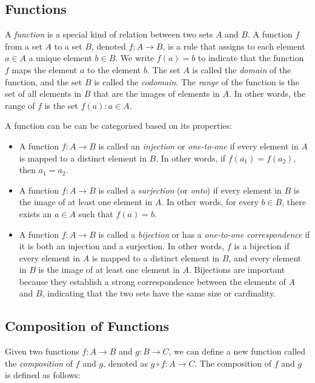\documentclass{report}
\begin{document}
\subsection{Functions}

A \textit{function} is a special kind of relation between two sets $A$ and $B$. A function $f$ from a set $A$ to a set $B$, denoted $f : A \to B$, is a rule that assigns to each element $a \in A$ a unique element $b \in B$. We write $f(a) = b$ to indicate that the function $f$ maps the element $a$ to the element $b$. The set $A$ is called the \textit{domain} of the function, and the set $B$ is called the \textit{codomain}. The \textit{range} of the function is the set of all elements in $B$ that are the images of elements in $A$. In other words, the range of $f$ is the set ${f(a) : a \in A}$.

A function can be can be categorised based on its properties:

\begin{itemize}
    \item A function $f : A \to B$ is called an \textit{injection} or \textit{one-to-one} if every element in $A$ is mapped to a distinct element in $B$. In other words, if $f(a_1) = f(a_2)$, then $a_1 = a_2$.

    \item A function $f : A \to B$ is called a \textit{surjection} (or \textit{onto}) if every element in $B$ is the image of at least one element in $A$. In other words, for every $b \in B$, there exists an $a \in A$ such that $f(a) = b$.

    \item A function $f : A \to B$ is called a \textit{bijection} or has a \textit{one-to-one correspondence} if it is both an injection and a surjection. In other words, $f$ is a bijection if every element in $A$ is mapped to a distinct element in $B$, and every element in $B$ is the image of at least one element in $A$. Bijections are important because they establish a strong correspondence between the elements of $A$ and $B$, indicating that the two sets have the same size or cardinality.

\end{itemize}

\subsection{Composition of Functions}

Given two functions $f : A \to B$ and $g : B \to C$, we can define a new function called the \textit{composition} of $f$ and $g$, denoted as $g \circ f : A \to C$. The composition of $f$ and $g$ is defined as follows:
\end{document}
